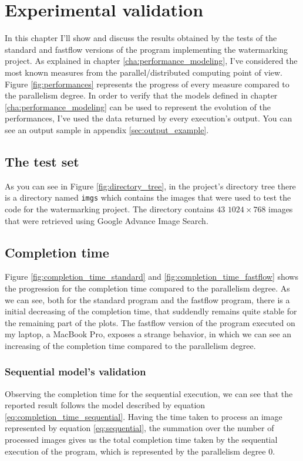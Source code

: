 \chapter{Experimental validation} %
\label{cha:experimental_validation}
    In this chapter I'll show and discuss the results obtained by the tests of the standard and fastflow
    versions of the program implementing the watermarking project. As explained in chapter
    \ref{cha:performance_modeling}, I've considered the most known measures from the parallel/distributed
    computing point of view. Figure \ref{fig:performances} represents the progress of every measure compared
    to the parallelism degree. In order to verify that the models defined in chapter
    \ref{cha:performance_modeling} can be used to represent the evolution of the performances, I've used the
    data returned by every execution's output. You can see an output sample in appendix
    \ref{sec:output_example}.
    \section{The test set} %
    \label{sec:the_test_set}
        As you can see in Figure \ref{fig:directory_tree}, in the project's directory tree there is a directory
        named \texttt{imgs} which contains the images that were used to test the code for the watermarking
        project. The directory contains $43$ $1024 \times 768$ images that were retrieved using Google Advance
        Image Search.
    \section{Completion time} %
    \label{sec:completion_time}
        Figure \ref{fig:completion_time_standard} and \ref{fig:completion_time_fastflow} shows the progression
        for the completion time compared to the parallelism degree. As we can see, both for the standard program
        and the fastflow program, there is a initial decreasing of the completion time, that suddendly remains
        quite stable for the remaining part of the plots. The fastflow version of the program executed on my
        laptop, a MacBook Pro, exposes a strange behavior, in which we can see an increasing of the completion
        time compared to the parallelism degree.
        \subsection{Sequential model's validation} %
        \label{sub:sequential_model_s_validation}
            Observing the completion time for the sequential execution, we can see that the
            reported result follows the model described by equation \ref{eq:completion_time_sequential}. Having
            the time taken to process an image represented by equation \ref{eq:sequential}, the summation over
            the number of processed images gives us the total completion time taken by the sequential execution
            of the program, which is represented by the parallelism degree $0$.
